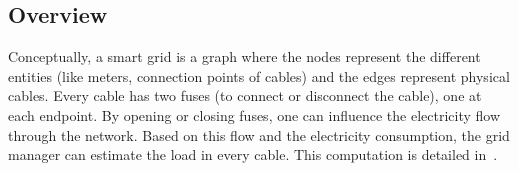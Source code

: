 \subsection{Overview}
\label{subsec:example-overview}




Conceptually, a smart grid is a graph where the nodes represent the different entities (like meters, connection points of cables) and the edges represent physical cables.
Every cable has two fuses (to connect or disconnect the cable), one at each endpoint.
By opening or closing fuses, one can influence the electricity flow through the network.
Based on this flow and the electricity consumption, the grid manager can estimate the load in every cable.
This computation is detailed in~\cite{DBLP:conf/sac/0001MFRKT16}.

